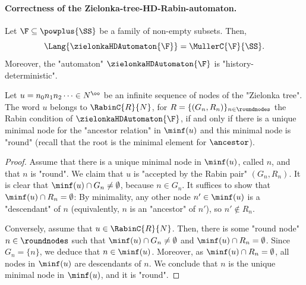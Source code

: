 \documentclass{theoretics}
\begin{document}
\paragraph*{Correctness of the Zielonka-tree-HD-Rabin-automaton.}

\begin{proposition}[Correctness]\label{prop-ZT:correctness_ZT_HD-Rabin}
	Let $\F\subseteq \powplus{\SS}$ be a family of non-empty subsets. Then, 
	\[ \Lang{\zielonkaHDAutomaton{\F}} = \MullerC{\F}{\SS}. \]
	Moreover, the "automaton" $\zielonkaHDAutomaton{\F}$ is "history-deterministic".
\end{proposition}


\begin{lemma}\label{lemma-ZT:Rabin-acc-sequences-nodes-ZT}
	Let $u = n_0n_1n_2\dots \in N^\oo$ be an infinite sequence of nodes of the "Zielonka tree". The word $u$ belongs to $\RabinC{R}{N}$, for $R = \{(G_n,R_n)\}_{n\in\roundnodes}$ the Rabin condition of $\zielonkaHDAutomaton{\F}$, if and only if there is a unique minimal node for the "ancestor relation" in $\minf(u)$ and this minimal node is "round" (recall that the root is the minimal element for $\ancestor$).
\end{lemma}
\begin{proof}
	Assume that there is a unique minimal node in $\minf(u)$, called $n$, and that $n$ is "round". We claim that $u$ is "accepted by the Rabin pair" $(G_n,R_n)$. It is clear that $\minf(u)\cap G_n\neq \emptyset$, because $n\in G_n$. It suffices to show that $\minf(u)\cap R_n = \emptyset$: By minimality, any other node $n'\in \minf(u)$ is a "descendant" of $n$ (equivalently, $n$ is an "ancestor" of $n'$), so $n'\notin R_n$.
	
	Conversely, assume that $u\in \RabinC{R}{N}$. Then, there is some "round node" $n\in \roundnodes$ such that $\minf(u)\cap G_n \neq \emptyset$ and $\minf(u)\cap R_n = \emptyset$. Since $G_n = \{n\}$, we deduce that $n\in \minf(u)$. Moreover, as $\minf(u)\cap R_n = \emptyset$, all nodes in $\minf(u)$ are descendants of $n$. We conclude that $n$ is the unique minimal node in $\minf(u)$, and it is "round".
\end{proof}
\end{document}
